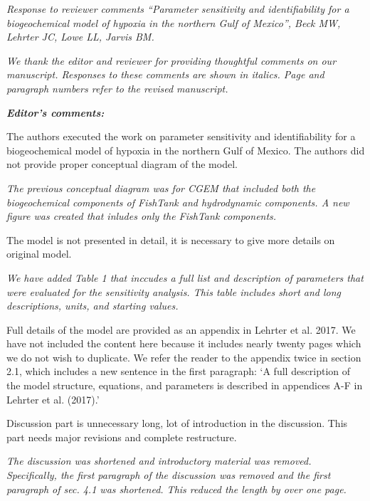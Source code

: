 \documentclass[letterpaper,12pt]{article}\usepackage[]{graphicx}\usepackage[]{color}
\newcommand{\Bigtxt}[1]{\textbf{\textit{#1}}}
\begin{document}
\raggedright


{\it Response to reviewer comments ``Parameter sensitivity and identifiability for a biogeochemical model of hypoxia in the northern Gulf of Mexico'', Beck MW, Lehrter JC, Lowe LL, Jarvis BM.}

{\it We thank the editor and reviewer for providing thoughtful comments on our manuscript.  Responses to these comments are shown in italics.  Page and paragraph numbers refer to the revised manuscript.}

\Bigtxt{Editor's comments:}

The authors executed the work on parameter sensitivity and identifiability for a biogeochemical model of hypoxia in the northern Gulf of Mexico. The authors did not provide proper conceptual diagram of the model.  

{\it The previous conceptual diagram was for CGEM that included both the biogeochemical components of FishTank and hydrodynamic components.  A new figure was created that inludes only the FishTank components.  }

The model is not presented in detail, it is necessary to give more details on original model. 

{\it We have added Table 1 that inccudes a full list and description of parameters that were evaluated for the sensitivity analysis. This table includes short and long descriptions, units, and starting values.  

Full details of the model are provided as an appendix in Lehrter et al. 2017.  We have not included the content here because it includes nearly twenty pages which we do not wish to duplicate.  We refer the reader to the appendix twice in section 2.1, which includes a new sentence in the first paragraph: `A full description of the model structure, equations, and parameters is described in appendices A-F in Lehrter et al. (2017).'  
}

Discussion part is unnecessary long, lot of introduction in the discussion. This part needs major revisions and complete restructure. 

{\it The discussion was shortened and introductory material was removed.  Specifically, the first paragraph of the discussion was removed and the first paragraph of sec. 4.1 was shortened.  This reduced the length by over one page.}
\end{document}
